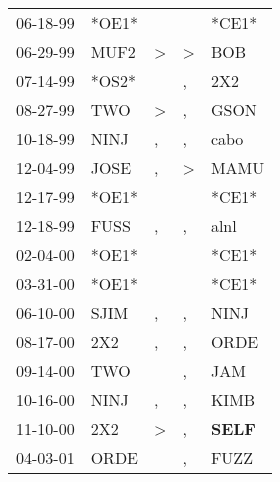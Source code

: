 \begin{supertabular}{p{0.07\textwidth}p{0.06\textwidth}p{0.02\textwidth}p{0.02\textwidth}p{0.06\textwidth}}
 06-18-99\textsuperscript{} &                   *OE1* &                  &                  &                            *CE1* \\
 06-29-99\textsuperscript{} &  MUF2\textsuperscript{} &     \textgreater &     \textgreater &            BOB\textsuperscript{} \\
 07-14-99\textsuperscript{} &                   *OS2* &                  &                , &            2X2\textsuperscript{} \\
 08-27-99\textsuperscript{} &   TWO\textsuperscript{} &     \textgreater &                , &           GSON\textsuperscript{} \\
 10-18-99\textsuperscript{} &  NINJ\textsuperscript{} &                , &                , &           cabo\textsuperscript{} \\
 12-04-99\textsuperscript{} &  JOSE\textsuperscript{} &                , &     \textgreater &           MAMU\textsuperscript{} \\
 12-17-99\textsuperscript{} &                   *OE1* &                  &                  &                            *CE1* \\
 12-18-99\textsuperscript{} &  FUSS\textsuperscript{} &                , &                , &           alnl\textsuperscript{} \\
 02-04-00\textsuperscript{} &                   *OE1* &                  &                  &                            *CE1* \\
 03-31-00\textsuperscript{} &                   *OE1* &                  &                  &                            *CE1* \\
 06-10-00\textsuperscript{} &  SJIM\textsuperscript{} &                , &                , &           NINJ\textsuperscript{} \\
 08-17-00\textsuperscript{} &   2X2\textsuperscript{} &                , &                , &           ORDE\textsuperscript{} \\
 09-14-00\textsuperscript{} &   TWO\textsuperscript{} &                  &                , &            JAM\textsuperscript{} \\
 10-16-00\textsuperscript{} &  NINJ\textsuperscript{} &                , &                , &           KIMB\textsuperscript{} \\
 11-10-00\textsuperscript{} &   2X2\textsuperscript{} &     \textgreater &                , &  \textbf{SELF\textsuperscript{}} \\
 04-03-01\textsuperscript{} &  ORDE\textsuperscript{} &                  &                , &           FUZZ\textsuperscript{} \\

\end{supertabular}
